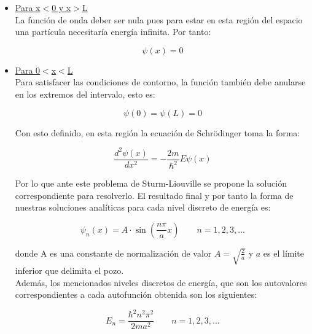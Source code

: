 \documentclass[12pt]{article}
\begin{document}
    \begin{itemize}
        \item \underline{Para x$<$0 y x$>$L}\\
        La función de onda deber ser nula pues para estar en esta región del espacio una partícula necesitaría energía infinita. Por tanto:

        \begin{equation*}
            \psi (x) = 0
        \end{equation*}

        \item \underline{Para 0$<$x$<$L}\\
        Para satisfacer las condiciones de contorno, la función también debe anularse en los extremos del intervalo, esto es:
        
        \begin{equation*}
            \psi (0) = \psi (L) = 0
        \end{equation*}
    
    Con esto definido, en esta región la ecuación de Schrödinger toma la forma: 

    \begin{equation}
    \frac{d^{2}\psi(x)}{d x^{2}} = -\frac{2m}{\hbar^2} E \psi(x)
    \end{equation}

    Por lo que ante este problema de Sturm-Liouville se propone la solución correspondiente para resolverlo. El resultado final y por tanto la forma de nuestras soluciones analíticas para cada nivel discreto de energía es:

\begin{equation*}
    \boxed{\psi_n (x) = A\cdot\sin{\left(\frac{n\pi}{a}x\right)}\,\,\,\,\,\,\,\,\,\,\,\, n=1,2,3,...}
\end{equation*}

    donde A es una constante de normalización de valor $A=\sqrt{\frac{2}{a}}$ y $a$ es el límite inferior que delimita el pozo.\\

    Además, los mencionados niveles discretos de energía, que son los autovalores correspondientes a cada autofunción obtenida son los siguientes:

    \begin{equation*}
    \boxed{E_n = \frac{\hbar^2n^2\pi^2}{2ma^2}\,\,\,\,\,\,\,\,\,\,\,\, n=1,2,3,...}
    \end{equation*}

    \end{itemize}
\end{document}
